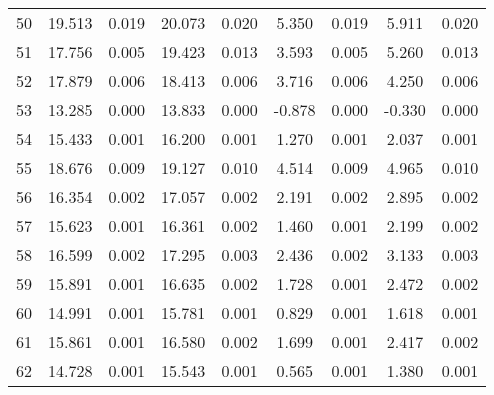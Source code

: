 \documentclass[10pt]{article}
\begin{document}
\begin{longtable}[c]{ccccc|cccc}
50 & \cellcolor{ gray!10 }  19.513 &  0.019 & \cellcolor{ gray!10 }  20.073 &  0.020 & \cellcolor{ gray!10 }  5.350 &  0.019 & \cellcolor{ gray!10 }  5.911 &  0.020 \\
51 & \cellcolor{ gray!10 }  17.756 &  0.005 & \cellcolor{ gray!10 }  19.423 &  0.013 & \cellcolor{ gray!10 }  3.593 &  0.005 & \cellcolor{ gray!10 }  5.260 &  0.013 \\
52 & \cellcolor{ gray!10 }  17.879 &  0.006 & \cellcolor{ gray!10 }  18.413 &  0.006 & \cellcolor{ gray!10 }  3.716 &  0.006 & \cellcolor{ gray!10 }  4.250 &  0.006 \\
53 & \cellcolor{ gray!10 }  13.285 &  0.000 & \cellcolor{ gray!10 }  13.833 &  0.000 & \cellcolor{ gray!10 } -0.878 &  0.000 & \cellcolor{ gray!10 } -0.330 &  0.000 \\
54 & \cellcolor{ gray!10 }  15.433 &  0.001 & \cellcolor{ gray!10 }  16.200 &  0.001 & \cellcolor{ gray!10 }  1.270 &  0.001 & \cellcolor{ gray!10 }  2.037 &  0.001 \\
55 & \cellcolor{ gray!10 }  18.676 &  0.009 & \cellcolor{ gray!10 }  19.127 &  0.010 & \cellcolor{ gray!10 }  4.514 &  0.009 & \cellcolor{ gray!10 }  4.965 &  0.010 \\
56 & \cellcolor{ gray!10 }  16.354 &  0.002 & \cellcolor{ gray!10 }  17.057 &  0.002 & \cellcolor{ gray!10 }  2.191 &  0.002 & \cellcolor{ gray!10 }  2.895 &  0.002 \\
57 & \cellcolor{ gray!10 }  15.623 &  0.001 & \cellcolor{ gray!10 }  16.361 &  0.002 & \cellcolor{ gray!10 }  1.460 &  0.001 & \cellcolor{ gray!10 }  2.199 &  0.002 \\
58 & \cellcolor{ gray!10 }  16.599 &  0.002 & \cellcolor{ gray!10 }  17.295 &  0.003 & \cellcolor{ gray!10 }  2.436 &  0.002 & \cellcolor{ gray!10 }  3.133 &  0.003 \\
59 & \cellcolor{ gray!10 }  15.891 &  0.001 & \cellcolor{ gray!10 }  16.635 &  0.002 & \cellcolor{ gray!10 }  1.728 &  0.001 & \cellcolor{ gray!10 }  2.472 &  0.002 \\
60 & \cellcolor{ gray!10 }  14.991 &  0.001 & \cellcolor{ gray!10 }  15.781 &  0.001 & \cellcolor{ gray!10 }  0.829 &  0.001 & \cellcolor{ gray!10 }  1.618 &  0.001 \\
61 & \cellcolor{ gray!10 }  15.861 &  0.001 & \cellcolor{ gray!10 }  16.580 &  0.002 & \cellcolor{ gray!10 }  1.699 &  0.001 & \cellcolor{ gray!10 }  2.417 &  0.002 \\
62 & \cellcolor{ gray!10 }  14.728 &  0.001 & \cellcolor{ gray!10 }  15.543 &  0.001 & \cellcolor{ gray!10 }  0.565 &  0.001 & \cellcolor{ gray!10 }  1.380 &  0.001 \\

\end{longtable}
\end{document}

